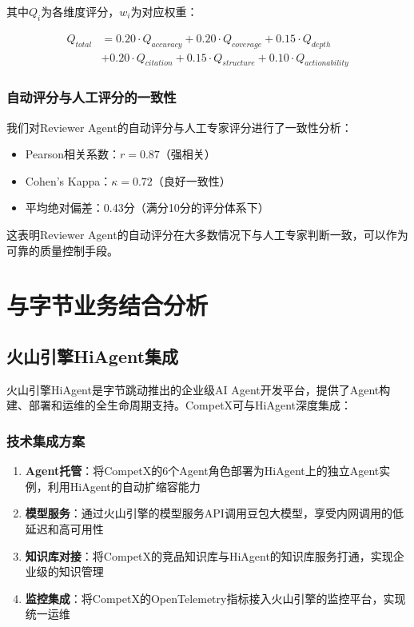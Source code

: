 \documentclass[12pt,a4paper]{ctexrep}
\begin{document}
其中$Q_i$为各维度评分，$w_i$为对应权重：

\begin{equation}
\begin{aligned}
Q_{total} &= 0.20 \cdot Q_{accuracy} + 0.20 \cdot Q_{coverage} + 0.15 \cdot Q_{depth} \\
&+ 0.20 \cdot Q_{citation} + 0.15 \cdot Q_{structure} + 0.10 \cdot Q_{actionability}
\end{aligned}
\end{equation}

\subsection{自动评分与人工评分的一致性}

我们对Reviewer Agent的自动评分与人工专家评分进行了一致性分析：

\begin{itemize}[leftmargin=2em]
\item Pearson相关系数：$r = 0.87$（强相关）
\item Cohen's Kappa：$\kappa = 0.72$（良好一致性）
\item 平均绝对偏差：0.43分（满分10分的评分体系下）
\end{itemize}

这表明Reviewer Agent的自动评分在大多数情况下与人工专家判断一致，可以作为可靠的质量控制手段。

\chapter{与字节业务结合分析}

\section{火山引擎HiAgent集成}

火山引擎HiAgent\cite{volcengine2025}是字节跳动推出的企业级AI Agent开发平台，提供了Agent构建、部署和运维的全生命周期支持。CompetX可与HiAgent深度集成：

\subsection{技术集成方案}

\begin{enumerate}[leftmargin=2em]
\item \textbf{Agent托管}：将CompetX的6个Agent角色部署为HiAgent上的独立Agent实例，利用HiAgent的自动扩缩容能力
\item \textbf{模型服务}：通过火山引擎的模型服务API调用豆包大模型，享受内网调用的低延迟和高可用性
\item \textbf{知识库对接}：将CompetX的竞品知识库与HiAgent的知识库服务打通，实现企业级的知识管理
\item \textbf{监控集成}：将CompetX的OpenTelemetry指标接入火山引擎的监控平台，实现统一运维
\end{enumerate}
\end{document}
